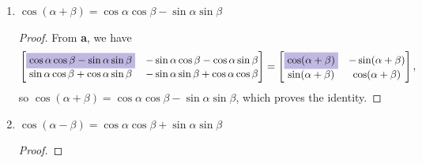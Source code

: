 \documentclass{article}
\begin{document}
\begin{enumerate}
\begin{enumerate}
\begin{proof}
\begin{align*}
\begin{bmatrix}
                    \cos\alpha\cos\beta + \sin\alpha\sin\beta&-\sin\alpha\cos\beta+\cos\alpha\sin\beta \\ 
                    -\cos\alpha\sin\beta + \sin\alpha\cos\beta& \sin\alpha\sin\beta + \cos\alpha\cos\beta
                \end{bmatrix}.
            \end{align*} Setting this to be equal to \(X\) and rearranging some terms, \[
                \begin{bmatrix}
                    \cos\alpha\cos\beta + \sin\alpha\sin\beta&-\sin\alpha\cos\beta+\cos\alpha\sin\beta \\ 
                    \colorbox{Periwinkle!42}{\(\sin\alpha\cos\beta -\cos\alpha\sin\beta\)} & \sin\alpha\sin\beta + \cos\alpha\cos\beta
                \end{bmatrix} = \begin{bmatrix}
                    \cos(\alpha - \beta)&-\sin(\alpha - \beta) \\ \colorbox{Periwinkle!42}{\(\sin(\alpha-\beta)\)}&\cos(\alpha - \beta)
                \end{bmatrix}
            \] gives us \(\sin(\alpha - \beta) = \sin\alpha\cos\beta - \cos\alpha\sin\beta\), which proves the identity. 
        \end{proof}
        \item \(\cos(\alpha + \beta) = \cos\alpha\cos\beta - \sin\alpha\sin\beta\)\begin{proof}
            From \textbf{a}, we have\[
                \begin{bmatrix}
                    \colorbox{Periwinkle!42}{\(\cos\alpha\cos\beta - \sin\alpha\sin\beta\)}&-\sin\alpha\cos\beta-\cos\alpha\sin\beta \\ 
                    \sin\alpha\cos\beta + \cos\alpha\sin\beta& -\sin\alpha\sin\beta + \cos\alpha\cos\beta
                \end{bmatrix} = \begin{bmatrix}
                    \colorbox{Periwinkle!42}{\(\cos(\alpha + \beta)\)}&-\sin(\alpha + \beta) \\ \sin(\alpha+\beta)&\cos(\alpha + \beta)
                \end{bmatrix},
            \] so \(\cos(\alpha + \beta) = \cos\alpha\cos\beta - \sin\alpha\sin\beta\), which proves the identity. 
        \end{proof}
        \item \(\cos(\alpha - \beta) = \cos\alpha\cos\beta + \sin\alpha\sin\beta\)\begin{proof}

\end{proof}
\end{enumerate}
\end{enumerate}
\end{document}
